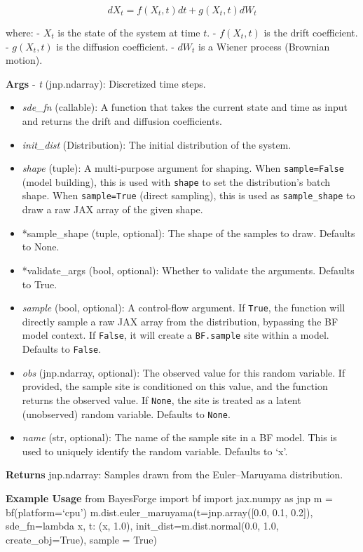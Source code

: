 \documentclass[
  letterpaper,
  DIV=11,
  numbers=noendperiod]{scrartcl}
\begin{document}
\[
   dX_t = f(X_t, t) dt + g(X_t, t) dW_t
\]

where: - \(X_t\) is the state of the system at time \(t\). -
\(f(X_t, t)\) is the drift coefficient. - \(g(X_t, t)\) is the diffusion
coefficient. - \(dW_t\) is a Wiener process (Brownian motion).

\textbf{Args} - \emph{t} (jnp.ndarray): Discretized time steps.

\begin{itemize}
\item
  \emph{sde\_fn} (callable): A function that takes the current state and
  time as input and returns the drift and diffusion coefficients.
\item
  \emph{init\_dist} (Distribution): The initial distribution of the
  system.
\item
  \emph{shape} (tuple): A multi-purpose argument for shaping. When
  \texttt{sample=False} (model building), this is used with
  \texttt{shape} to set the distribution's batch shape. When
  \texttt{sample=True} (direct sampling), this is used as
  \texttt{sample\_shape} to draw a raw JAX array of the given shape.
\item
  *sample\_shape (tuple, optional): The shape of the samples to draw.
  Defaults to None.
\item
  *validate\_args (bool, optional): Whether to validate the arguments.
  Defaults to True.
\item
  \emph{sample} (bool, optional): A control-flow argument. If
  \texttt{True}, the function will directly sample a raw JAX array from
  the distribution, bypassing the BF model context. If \texttt{False},
  it will create a \texttt{BF.sample} site within a model. Defaults to
  \texttt{False}.
\item
  \emph{obs} (jnp.ndarray, optional): The observed value for this random
  variable. If provided, the sample site is conditioned on this value,
  and the function returns the observed value. If \texttt{None}, the
  site is treated as a latent (unobserved) random variable. Defaults to
  \texttt{None}.
\item
  \emph{name} (str, optional): The name of the sample site in a BF
  model. This is used to uniquely identify the random variable. Defaults
  to `x'.
\end{itemize}

\textbf{Returns} jnp.ndarray: Samples drawn from the Euler--Maruyama
distribution.

\textbf{Example Usage} from BayesForge import bf import jax.numpy as jnp
m = bf(platform=`cpu') m.dist.euler\_maruyama(t=jnp.array({[}0.0, 0.1,
0.2{]}), sde\_fn=lambda x, t: (x, 1.0), init\_dist=m.dist.normal(0.0,
1.0, create\_obj=True), sample = True)
\end{document}
